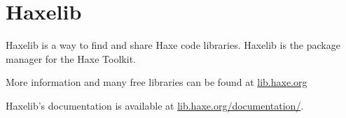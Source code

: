 \chapter{Haxelib}
\label{haxelib}

Haxelib is a way to find and share Haxe code libraries. Haxelib is the package manager for the Haxe Toolkit.

More information and many free libraries can be found at \href{https://lib.haxe.org/}{lib.haxe.org}

Haxelib's documentation is available at \href{https://lib.haxe.org/documentation/using-haxelib/}{lib.haxe.org/documentation/}.

